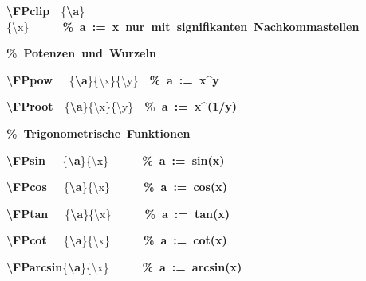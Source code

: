 {{\rule[-0.5ex]{0pt}{2.5ex}\hspace*{0.0em}\textcolor{R}{\textbf{\textbackslash{}FPclip}}~~\{\textcolor{B}{\textbf{\textbackslash{}a}}\}\{\textbackslash{}x\}~~~~~~\textcolor{G}{\textbf{\%~a~:=~x~nur~mit~signifikanten~Nachkommastellen}}\\
\rule[-0.5ex]{0pt}{2.5ex}\hspace*{0.0em}\textcolor{G}{\textbf{\%~Potenzen~und~Wurzeln}}\\
\rule[-0.5ex]{0pt}{2.5ex}\hspace*{0.0em}\textcolor{R}{\textbf{\textbackslash{}FPpow}}~~~\{\textcolor{B}{\textbf{\textbackslash{}a}}\}\{\textbackslash{}x\}\{\textbackslash{}y\}~~\textcolor{G}{\textbf{\%~a~:=~x\^{}y}}\\
\rule[-0.5ex]{0pt}{2.5ex}\hspace*{0.0em}\textcolor{R}{\textbf{\textbackslash{}FProot}}~~\{\textcolor{B}{\textbf{\textbackslash{}a}}\}\{\textbackslash{}x\}\{\textbackslash{}y\}~~\textcolor{G}{\textbf{\%~a~:=~x\^{}(1/y)}}\\
\rule[-0.5ex]{0pt}{2.5ex}\hspace*{0.0em}\textcolor{G}{\textbf{\%~Trigonometrische~Funktionen}}\\
\rule[-0.5ex]{0pt}{2.5ex}\hspace*{0.0em}\textcolor{R}{\textbf{\textbackslash{}FPsin}}~~~\{\textcolor{B}{\textbf{\textbackslash{}a}}\}\{\textbackslash{}x\}~~~~~~\textcolor{G}{\textbf{\%~a~:=~sin(x)}}\\
\rule[-0.5ex]{0pt}{2.5ex}\hspace*{0.0em}\textcolor{R}{\textbf{\textbackslash{}FPcos}}~~~\{\textcolor{B}{\textbf{\textbackslash{}a}}\}\{\textbackslash{}x\}~~~~~~\textcolor{G}{\textbf{\%~a~:=~cos(x)}}\\
\rule[-0.5ex]{0pt}{2.5ex}\hspace*{0.0em}\textcolor{R}{\textbf{\textbackslash{}FPtan}}~~~\{\textcolor{B}{\textbf{\textbackslash{}a}}\}\{\textbackslash{}x\}~~~~~~\textcolor{G}{\textbf{\%~a~:=~tan(x)}}\\
\rule[-0.5ex]{0pt}{2.5ex}\hspace*{0.0em}\textcolor{R}{\textbf{\textbackslash{}FPcot}}~~~\{\textcolor{B}{\textbf{\textbackslash{}a}}\}\{\textbackslash{}x\}~~~~~~\textcolor{G}{\textbf{\%~a~:=~cot(x)}}\\
\rule[-0.5ex]{0pt}{2.5ex}\hspace*{0.0em}\textcolor{R}{\textbf{\textbackslash{}FParcsin}}\{\textcolor{B}{\textbf{\textbackslash{}a}}\}\{\textbackslash{}x\}~~~~~~\textcolor{G}{\textbf{\%~a~:=~arcsin(x)}}\\
}}
